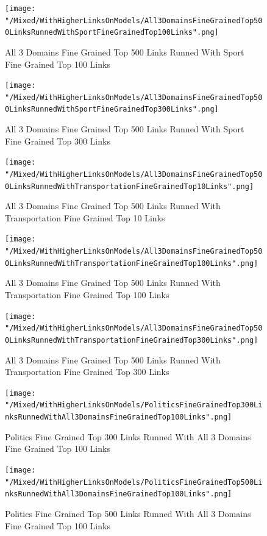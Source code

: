 \documentclass[thesis=M,english]{FITthesis}[2018/05/30]
\begin{document}
	\begin{figure}[H]\centering
		\texttt{[image: "/Mixed/WithHigherLinksOnModels/All3DomainsFineGrainedTop500LinksRunnedWithSportFineGrainedTop100Links".png]}
		\caption{All 3 Domains Fine Grained Top 500 Links Runned With Sport Fine Grained Top 100 Links}\label{}
	\end{figure}
	
	\begin{figure}[H]\centering
		\texttt{[image: "/Mixed/WithHigherLinksOnModels/All3DomainsFineGrainedTop500LinksRunnedWithSportFineGrainedTop300Links".png]}
		\caption{All 3 Domains Fine Grained Top 500 Links Runned With Sport Fine Grained Top 300 Links}\label{}
	\end{figure}
	
	\begin{figure}[H]\centering
		\texttt{[image: "/Mixed/WithHigherLinksOnModels/All3DomainsFineGrainedTop500LinksRunnedWithTransportationFineGrainedTop10Links".png]}
		\caption{All 3 Domains Fine Grained Top 500 Links Runned With Transportation Fine Grained Top 10 Links}\label{}
	\end{figure}	
	
	\begin{figure}[H]\centering
		\texttt{[image: "/Mixed/WithHigherLinksOnModels/All3DomainsFineGrainedTop500LinksRunnedWithTransportationFineGrainedTop100Links".png]}
		\caption{All 3 Domains Fine Grained Top 500 Links Runned With Transportation Fine Grained Top 100 Links}\label{}
	\end{figure}	
	
	\begin{figure}[H]\centering
		\texttt{[image: "/Mixed/WithHigherLinksOnModels/All3DomainsFineGrainedTop500LinksRunnedWithTransportationFineGrainedTop300Links".png]}
		\caption{All 3 Domains Fine Grained Top 500 Links Runned With Transportation Fine Grained Top 300 Links}\label{}
	\end{figure}	
	
	\begin{figure}[H]\centering
		\texttt{[image: "/Mixed/WithHigherLinksOnModels/PoliticsFineGrainedTop300LinksRunnedWithAll3DomainsFineGrainedTop100Links".png]}
		\caption{Politics Fine Grained Top 300 Links Runned With All 3 Domains Fine Grained Top 100 Links}\label{}
	\end{figure}	
	
	\begin{figure}[H]\centering
		\texttt{[image: "/Mixed/WithHigherLinksOnModels/PoliticsFineGrainedTop500LinksRunnedWithAll3DomainsFineGrainedTop100Links".png]}
		\caption{Politics Fine Grained Top 500 Links Runned With All 3 Domains Fine Grained Top 100 Links}\label{}
	\end{figure}
	
\end{document}
